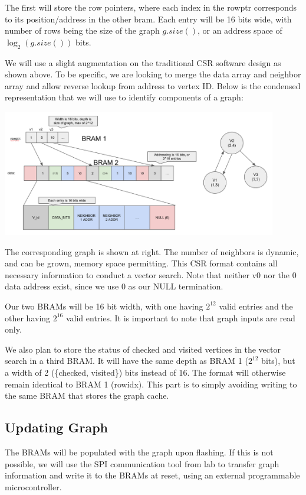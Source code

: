 \documentclass{article}
\begin{document}
The first will store the row pointers, where each index in the rowptr corresponds to its position/address in the other bram. Each entry will be 16 bits wide, with number of rows being the size of the graph $g.size()$, or an address space of $\log_2(g.size())$ bits.

We will use a slight augmentation on the traditional CSR software design as shown above. To be specific, we are looking to merge the data array and neighbor array and allow reverse lookup from address to vertex ID. Below is the condensed representation that we will use to identify components of a graph:

\includegraphics[width=12cm]{csr_entry.png}

The corresponding graph is shown at right. The number of neighbors is dynamic, and can be grown, memory space permitting. This CSR format contains all necessary information to conduct a vector search. Note that neither v0 nor the 0 data address exist, since we use 0 as our NULL termination.

Our two BRAMs will be 16 bit width, with one having $2^{12}$ valid entries and the other having $2^{16}$ valid entries. It is important to note that graph inputs are read only. 

We also plan to store the status of checked and visited vertices in the vector search in a third BRAM. It will have the same depth as BRAM 1 ($2^{12}$ bits), but a width of 2 (\{checked, visited\}) bits instead of 16. The format will otherwise remain identical to BRAM 1 (rowidx). This part is to simply avoiding writing to the same BRAM that stores the graph cache.

\subsection{Updating Graph}

The BRAMs will be populated with the graph upon flashing. If this is not possible, we will use the SPI communication tool from lab to transfer graph information and write it to the BRAMs at reset, using an external programmable microcontroller.
\end{document}
